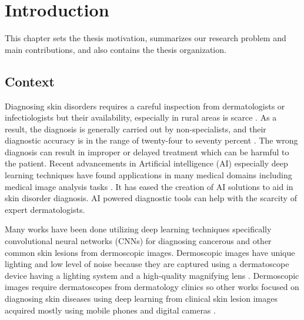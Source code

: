 \chapter{Introduction}\label{chap:introduction}

\begin{center}
	\begin{minipage}{0.8\textwidth}
		\begin{small}
			This chapter sets the thesis motivation, summarizes our research problem and main contributions, and also contains the thesis organization.
		\end{small}
	\end{minipage}
	\vspace{0.5cm}
\end{center}

\minitoc

\section{Context}
Diagnosing skin disorders requires a careful inspection from dermatologists or infectiologists but their availability, especially in rural areas is scarce \cite{Feng2018}. As a result, the diagnosis is generally carried out by non-specialists, and their diagnostic accuracy is in the range of twenty-four to seventy percent \cite{Seth2017,Tran2005}. The wrong diagnosis can result in improper or delayed treatment which can be harmful to the patient. Recent advancements in Artificial intelligence (AI) especially deep learning techniques have found applications in many medical domains including medical image analysis tasks \cite{BENHAMIDA2021104730, Czepita2021, liu2022explainable, visapp23barra}. It has eased the creation of AI solutions to aid in skin disorder diagnosis. AI powered diagnostic tools can help with the scarcity of expert dermatologists.

Many works have been done utilizing deep learning techniques specifically convolutional neural networks (CNNs) for diagnosing cancerous and other common skin lesions from dermoscopic images. Dermoscopic images have unique lighting and low level of noise because they are captured using a dermatoscope device having a lighting system and a high-quality magnifying lens \cite{sun2016benchmark}. Dermoscopic images require dermatoscopes from dermatology clinics so other works focused on diagnosing skin diseases using deep learning from clinical skin lesion images acquired mostly using mobile phones and digital cameras \cite{sun2016benchmark}. 

